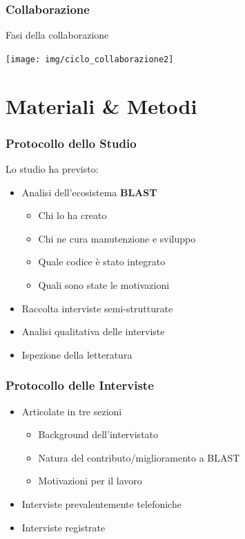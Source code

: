 \begin{frame}\frametitle{Collaborazione}

\begin{center}
\Large{Fasi della collaborazione}
\end{center}

\vspace{.5cm}

\begin{center}
    \texttt{[image: img/ciclo\_collaborazione2]}
\end{center}

\end{frame}

\section{Materiali \& Metodi}

\begin{frame}\frametitle{Protocollo dello Studio}

Lo studio ha previsto:

\begin{itemize}[<+->]
\itemsep1pt\parskip0pt
\item
  Analisi dell'ecosistema \alert{\textbf{BLAST}}

  \begin{itemize}[<+->]
  \itemsep1pt\parskip0pt
  \item
    Chi lo ha creato
  \item
    Chi ne cura manutenzione e sviluppo
  \item
    Quale codice è stato integrato
  \item
    Quali sono state le motivazioni
  \end{itemize}
\item
  Raccolta interviste semi-strutturate
\item
  Analisi qualitativa delle interviste
\item
  Ispezione della letteratura
\end{itemize}

\end{frame}

\begin{frame}\frametitle{Protocollo delle Interviste}

\begin{itemize}[<+->]
\itemsep1pt\parskip0pt
\item
  Articolate in tre sezioni

  \begin{itemize}[<+->]
  \itemsep1pt\parskip0pt
  \item
    Background dell'intervistato
  \item
    Natura del contributo/miglioramento a BLAST
  \item
    Motivazioni per il lavoro
  \end{itemize}
\item
  Interviste prevalentemente telefoniche
\item
  Interviste registrate
\end{itemize}

\end{frame}

